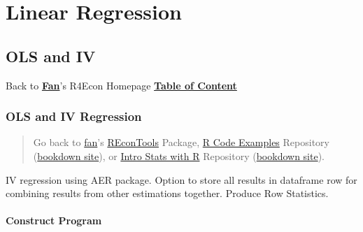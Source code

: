 \documentclass[
]{book}
\begin{document}
\hypertarget{linear-regression}{%
\chapter{Linear Regression}\label{linear-regression}}

\hypertarget{ols-and-iv}{%
\section{OLS and IV}\label{ols-and-iv}}

Back to \textbf{\href{https://fanwangecon.github.io/}{Fan}}'s R4Econ Homepage \textbf{\href{https://fanwangecon.github.io/R4Econ/}{Table of Content}}

\hypertarget{ols-and-iv-regression}{%
\subsection{OLS and IV Regression}\label{ols-and-iv-regression}}

\begin{quote}
Go back to \href{http://fanwangecon.github.io/}{fan}'s \href{https://fanwangecon.github.io/REconTools/}{REconTools} Package, \href{https://fanwangecon.github.io/R4Econ/}{R Code Examples} Repository (\href{https://fanwangecon.github.io/R4Econ/bookdown}{bookdown site}), or \href{https://fanwangecon.github.io/Stat4Econ/}{Intro Stats with R} Repository (\href{https://fanwangecon.github.io/Stat4Econ/bookdown}{bookdown site}).
\end{quote}

IV regression using AER package. Option to store all results in dataframe row for combining results from other estimations together. Produce Row Statistics.

\hypertarget{construct-program}{%
\subsubsection{Construct Program}\label{construct-program}}
\end{document}
